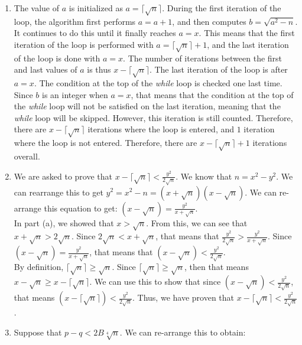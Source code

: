 \documentclass[11pt]{article}
\theoremstyle{definition}
\begin{document}
\begin{enumerate}
\begin{enumerate}
\item  %
The value of $a$ is initialized as $a = \lceil \sqrt{n} \rceil$. During the first iteration of the loop, the algorithm first performs $a = a + 1$, and then computes $b = \sqrt{a^2 - n}$. It continues to do this until it finally reaches $a = x$. This means that the first iteration of the loop is performed with $a = \lceil \sqrt{n} \rceil + 1$, and the last iteration of the loop is done with $a = x$. The number of iterations between the first and last values of $a$ is thus $x - \lceil \sqrt{n} \rceil$. The last iteration of the loop is after $a = x$. The condition at the top of the \textit{while} loop is checked one last time. Since $b$ is an integer when $a = x$, that means that the condition at the top of the \textit{while} loop will not be satisfied on the last iteration, meaning that the \textit{while} loop will be skipped. However, this iteration is still counted. Therefore, there are $x - \lceil \sqrt{n} \rceil$ iterations where the loop is entered, and $1$ iteration where the loop is not entered. Therefore, there are $x - \lceil \sqrt{n} \rceil + 1$ iterations overall.

\item  %
We are asked to prove that $x - \lceil \sqrt{n} \rceil < \frac{y^2}{2\sqrt{n}}$. We know that $n = x^2 - y^2$. We can rearrange this to get $y^2 = x^2 - n = (x + \sqrt{n})(x - \sqrt{n})$. We can re-arrange this equation to get: $(x - \sqrt{n}) = \frac{y^2}{x + \sqrt{n}}$. \\

In part (a), we showed that $x > \sqrt{n}$. From this, we can see that $x + \sqrt{n} > 2\sqrt{n}$. Since $2\sqrt{n} < x + \sqrt{n}$, that means that $\frac{y^2}{2\sqrt{n}} > \frac{y^2}{x + \sqrt{n}}$. Since $(x - \sqrt{n}) = \frac{y^2}{x + \sqrt{n}}$, that means that $(x - \sqrt{n}) < \frac{y^2}{2\sqrt{n}}$. \\

By definition, $\lceil \sqrt{n} \rceil \geq \sqrt{n}$. Since $\lceil \sqrt{n} \rceil \geq \sqrt{n}$, then that means $x - \sqrt{n} \geq x - \lceil \sqrt{n} \rceil$. We can use this to show that since $(x - \sqrt{n}) < \frac{y^2}{2\sqrt{n}}$, that means $(x - \lceil \sqrt{n} \rceil) < \frac{y^2}{2\sqrt{n}}$. Thus, we have proven that $x - \lceil \sqrt{n} \rceil < \frac{y^2}{2\sqrt{n}}$.

\item  %
Suppose that $p - q < 2B\sqrt[4]{n}$. We can re-arrange this to obtain:


\end{enumerate}
\end{enumerate}
\end{document}
